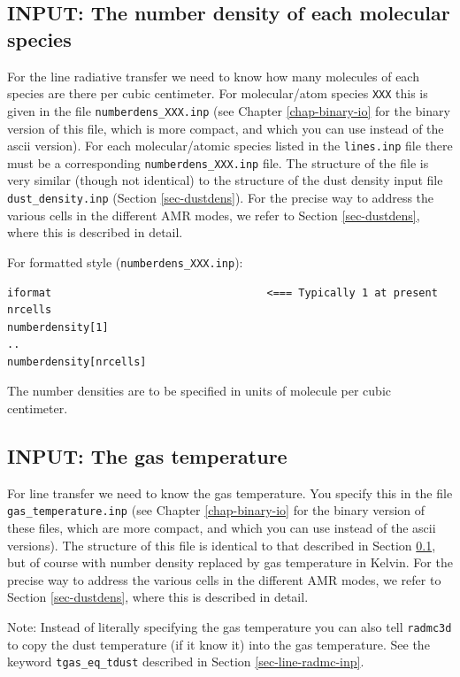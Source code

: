 \documentclass{report}
\newenvironment{asciibox}%
  {\begin{list}{}{%
    \setlength{\topsep}{0.5em}%
    \setlength{\parskip}{0em}%
    \setlength{\parsep}{0em}%
    \setlength{\itemsep}{0em}%
    \setlength{\rightmargin}{0em}%
    \setlength{\leftmargin}{3.0em}%
    \setlength{\labelsep}{1em}%
    \setlength{\labelwidth}{2em}%
  }\normalfont\footnotesize\item}
  {\end{list}}
\begin{document}
\subsection{INPUT: The number density of each molecular species}
\label{sec-mol-numdensity}
%
For the line radiative transfer we need to know how many molecules of each
species are there per cubic centimeter. For molecular/atom species
{\small\tt XXX} this is given in the file {\small\tt numberdens\_XXX.inp}
(see Chapter \ref{chap-binary-io} for the binary version of this file, which
is more compact, and which you can use instead of the ascii version). For
each molecular/atomic species listed in the {\small\tt lines.inp} file there
must be a corresponding {\small\tt numberdens\_XXX.inp} file. The structure
of the file is very similar (though not identical) to the structure of the
dust density input file {\small\tt dust\_density.inp} (Section
\ref{sec-dustdens}). For the precise way to address the various cells in the
different AMR modes, we refer to Section \ref{sec-dustdens}, where this is
described in detail.

For formatted style ({\small\tt numberdens\_XXX.inp}):
\begin{asciibox}\begin{verbatim}
iformat                                  <=== Typically 1 at present
nrcells
numberdensity[1]
..
numberdensity[nrcells]
\end{verbatim}\end{asciibox}
The number densities are to be specified in units of molecule per cubic
centimeter.

\subsection{INPUT: The gas temperature}
\label{sec-gas-temperature}
%
For line transfer we need to know the gas temperature. You specify this in
the file {\small\tt gas\_temperature.inp} (see Chapter \ref{chap-binary-io}
for the binary version of these files, which are more compact, and which you
can use instead of the ascii versions). The structure of this file is
identical to that described in Section \ref{sec-mol-numdensity}, but of
course with number density replaced by gas temperature in Kelvin. For the
precise way to address the various cells in the different AMR modes, we
refer to Section \ref{sec-dustdens}, where this is described in detail.

Note: Instead of literally specifying the gas temperature you can also tell
{\small\tt radmc3d} to copy the dust temperature (if it know it) into the
gas temperature. See the keyword {\small\tt tgas\_eq\_tdust} described in
Section \ref{sec-line-radmc-inp}. 
\end{document}
